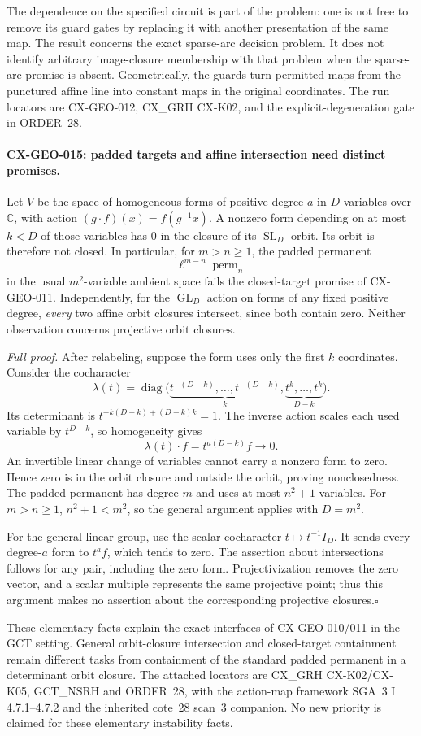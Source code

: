 The dependence on the specified circuit is part of the problem:
one is not free to remove its guard gates by replacing it with
another presentation of the same map. The result concerns the
exact sparse-arc decision problem. It does not identify arbitrary
image-closure membership with that problem when the sparse-arc
promise is absent. Geometrically, the guards turn permitted maps
from the punctured affine line into constant maps in the original
coordinates. The run locators are CX-GEO-012, CX\_GRH CX-K02,
and the explicit-degeneration gate in ORDER~28.

\paragraph{CX-GEO-015: padded targets and affine intersection need distinct promises.}
Let $V$ be the space of homogeneous forms of positive degree $a$
in $D$ variables over $\mathbb C$, with action
$(g\cdot f)(x)=f(g^{-1}x)$. A nonzero form depending on at most
$k<D$ of those variables has $0$ in the closure of its
$\operatorname{SL}_D$-orbit. Its orbit is therefore not closed.
In particular, for $m>n\ge1$, the padded permanent
\[
                    \ell^{m-n}\operatorname{perm}_n
\]
in the usual $m^2$-variable ambient space fails the closed-target
promise of CX-GEO-011. Independently, for the
$\operatorname{GL}_D$ action on forms of any fixed positive degree,
\emph{every} two affine orbit closures intersect, since both
contain zero. Neither observation concerns projective orbit closures.

\emph{Full proof.}
After relabeling, suppose the form uses only the first $k$
coordinates. Consider the cocharacter
\[
 \lambda(t)=\operatorname{diag}
   \bigl(\underbrace{t^{-(D-k)},\ldots,t^{-(D-k)}}_{k},
         \underbrace{t^k,\ldots,t^k}_{D-k}\bigr).
\]
Its determinant is
$t^{-k(D-k)+(D-k)k}=1$. The inverse action scales each used
variable by $t^{D-k}$, so homogeneity gives
\[
                 \lambda(t)\cdot f=t^{a(D-k)}f\longrightarrow0.
\]
An invertible linear change of variables cannot carry a nonzero
form to zero. Hence zero is in the orbit closure and outside the
orbit, proving nonclosedness. The padded permanent has degree $m$
and uses at most $n^2+1$ variables. For $m>n\ge1$,
$n^2+1<m^2$, so the general argument applies with $D=m^2$.

For the general linear group, use the scalar cocharacter
$t\mapsto t^{-1}I_D$. It sends every degree-$a$ form to
$t^af$, which tends to zero. The assertion about intersections
follows for any pair, including the zero form. Projectivization
removes the zero vector, and a scalar multiple represents the
same projective point; thus this argument makes no assertion
about the corresponding projective closures.\hfill$\square$

These elementary facts explain the exact interfaces of
CX-GEO-010/011 in the GCT setting. General orbit-closure
intersection and closed-target containment remain different tasks
from containment of the standard padded permanent in a determinant
orbit closure. The attached locators are CX\_GRH CX-K02/CX-K05,
GCT\_NSRH and ORDER~28, with the action-map framework
SGA~3 I 4.7.1--4.7.2 and the inherited cote~28 scan~3 companion.
No new priority is claimed for these elementary instability facts.
